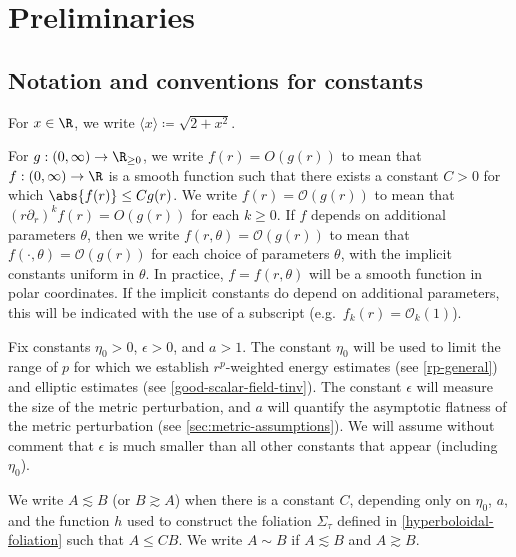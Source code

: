\documentclass[10pt, reqno]{amsart}
\begin{document}
\section{Preliminaries}
\label{preliminaries}
\subsection{Notation and conventions for constants}
\label{sec:notation} For \(x\in \R\), we write
\(\langle{}x\rangle{}\coloneqq{}\sqrt{2 + x^2}\).

For \(g : (0,\infty)\to \R_{\ge 0}\), we write \(f(r) = O(g(r))\) to mean that \(f :
(0,\infty)\to \R\) is a smooth function such that there exists a constant \(C >
0\) for which \(\abs{f(r)}\le Cg(r)\). We write \(f(r) = \mathcal{O}(g(r))\) to
mean that \((r\partial_r)^{k}f(r) = O(g(r))\) for each \(k\ge
0\). If \(f\) depends on additional parameters \(\theta{}\), then we write
\(f(r,\theta{}) = \mathcal{O}(g(r))\) to mean that \(f(\cdot ,\theta{}) =
\mathcal{O}(g(r))\) for each choice of parameters \(\theta{}\), with the
implicit constants uniform in \(\theta{}\). In practice, \(f = f(r,\theta{})\)
will be a smooth function in polar coordinates. If the implicit constants do
depend on additional parameters, this will be indicated with the use of a
subscript (e.g.~\(f_k(r) = \mathcal{O}_k(1)\)).

Fix constants \(\eta_0 > 0\), \(\epsilon{} > 0\), and \(a>1\). The constant \(\eta_0\) will be
used to limit the range of \(p\) for which we establish \(r^p\)-weighted energy
estimates (see \cref{rp-general}) and elliptic estimates (see
\cref{good-scalar-field-tinv}). The constant \(\epsilon{}\) will measure the size
of the metric perturbation, and \(a\) will quantify the asymptotic flatness of
the metric perturbation (see \cref{sec:metric-assumptions}). We will assume without
comment that \(\epsilon{}\) is much smaller than all other constants that appear
(including \(\eta_0\)).

We write \(A\lesssim B\) (or \(B\gtrsim A\)) when there is a constant \(C\),
depending only on \(\eta_0\), \(a\), and the function \(h\) used to construct
the foliation \(\Sigma_\tau{}\) defined in \cref{hyperboloidal-foliation} such that
\(A\le CB\). We write \(A\sim B\) if \(A\lesssim B\) and \(A\gtrsim B\).
\end{document}
